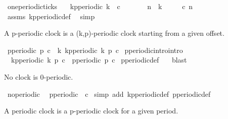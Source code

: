 \begin{isabellebody}
\isamarkupfalse%
\ one{\isacharunderscore}periodic{\isacharunderscore}ticks{\isacharcolon}\isanewline
\ \ \ {\isacartoucheopen}kp{\isacharunderscore}periodic\ k\ {}\ c{\isacartoucheclose}\isanewline
\ \ \ \ \ \ \ {\isacartoucheopen}n\ {\isasymge}\ k{\isacartoucheclose}\isanewline
\ \ \ \ \ {\isacartoucheopen}c\ n{\isacartoucheclose}\isanewline
%
\isadelimproof
%
\endisadelimproof
%
\isatagproof
{}\isamarkupfalse%
\ assms\ kp{\isacharunderscore}periodic{\isacharunderscore}def\ \isamarkupfalse%
\ simp%
\endisatagproof
{\isafoldproof}%
%
\isadelimproof
%
\endisadelimproof
%
\begin{isamarkuptext}%
A p-periodic clock is a (k,p)-periodic clock starting from a given offset.%
\end{isamarkuptext}\isamarkuptrue%
\isamarkupfalse%
\ {\isacartoucheopen}p{\isacharunderscore}periodic\ p\ c\ {\isasymequiv}\ {\isacharparenleft}{\isasymexists}k{\isachardot}\ kp{\isacharunderscore}periodic\ k\ p\ c{\isacharparenright}{\isacartoucheclose}\isanewline
\isanewline
{}\isamarkupfalse%
\ p{\isacharunderscore}periodic{\isacharunderscore}intro{\isacharbrackleft}intro{\isacharbrackright}{\isacharcolon}\isanewline
\ \ {\isacartoucheopen}kp{\isacharunderscore}periodic\ k\ p\ c\ {\isasymLongrightarrow}\ p{\isacharunderscore}periodic\ p\ c{\isacartoucheclose}\isanewline
%
\isadelimproof
%
\endisadelimproof
%
\isatagproof
{}\isamarkupfalse%
\ p{\isacharunderscore}periodic{\isacharunderscore}def\ \ \isamarkupfalse%
\ blast%
\endisatagproof
{\isafoldproof}%
%
\isadelimproof
%
\endisadelimproof
%
\begin{isamarkuptext}%
No clock is 0-periodic.%
\end{isamarkuptext}\isamarkuptrue%
\isamarkupfalse%
\ no{\isacharunderscore}{}{\isacharunderscore}periodic{\isacharcolon}\isanewline
\ \ {\isacartoucheopen}{\isasymnot}p{\isacharunderscore}periodic\ {}\ c{\isacartoucheclose}\isanewline
%
\isadelimproof
%
\endisadelimproof
%
\isatagproof
{}\isamarkupfalse%
\ {\isacharparenleft}simp\ add{\isacharcolon}\ kp{\isacharunderscore}periodic{\isacharunderscore}def\ p{\isacharunderscore}periodic{\isacharunderscore}def{\isacharparenright}%
\endisatagproof
{\isafoldproof}%
%
\isadelimproof
%
\endisadelimproof
%
\begin{isamarkuptext}%
A periodic clock is a p-periodic clock for a given period.%

\end{isamarkuptext}
\end{isabellebody}
